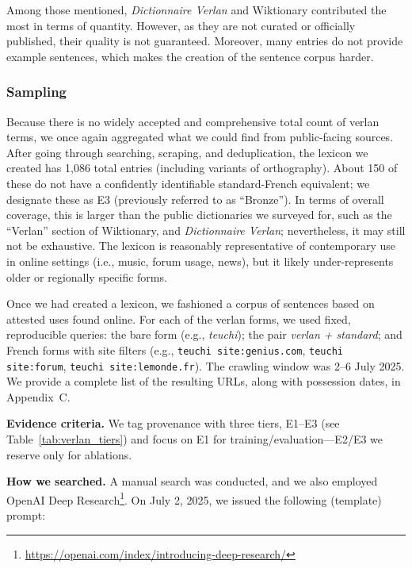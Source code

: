 \documentclass[12pt]{article}
\begin{document}
Among those mentioned, \textit{Dictionnaire Verlan} and Wiktionary contributed the most in terms of quantity. However, as they are not curated or officially published, their quality is not guaranteed. Moreover, many entries do not provide example sentences, which makes the creation of the sentence corpus harder.

\subsubsection{Sampling}

Because there is no widely accepted and comprehensive total count of verlan terms, we once again aggregated what we could find from public-facing sources. After going through searching, scraping, and deduplication, the lexicon we created has 1{,}086 total entries (including variants of orthography). About 150 of these do not have a confidently identifiable standard-French equivalent; we designate these as E3 (previously referred to as ``Bronze''). In terms of overall coverage, this is larger than the public dictionaries we surveyed for, such as the ``Verlan'' section of Wiktionary, and \textit{Dictionnaire Verlan}; nevertheless, it may still not be exhaustive. The lexicon is reasonably representative of contemporary use in online settings (i.e., music, forum usage, news), but it likely under-represents older or regionally specific forms.

Once we had created a lexicon, we fashioned a corpus of sentences based on attested uses found online. For each of the verlan forms, we used fixed, reproducible queries: the bare form (e.g., \textit{teuchi}); the pair \textit{verlan + standard}; and French forms with site filters (e.g., \texttt{teuchi site:genius.com}, \texttt{teuchi site:forum}, \texttt{teuchi site:lemonde.fr}). The crawling window was 2--6 July 2025. We provide a complete list of the resulting URLs, along with possession dates, in Appendix~C.

\vspace{0.5em}

\textbf{Evidence criteria.} We tag provenance with three tiers, E1--E3 (see Table~\ref{tab:verlan_tiers}) and focus on E1 for training/evaluation\;---\;E2/E3 we reserve only for ablations.

\vspace{0.5em}

\textbf{How we searched.} A manual search was conducted, and we also employed OpenAI Deep Research\footnote{\url{https://openai.com/index/introducing-deep-research/}}. On July 2, 2025, we issued the following (template) prompt:
\end{document}
